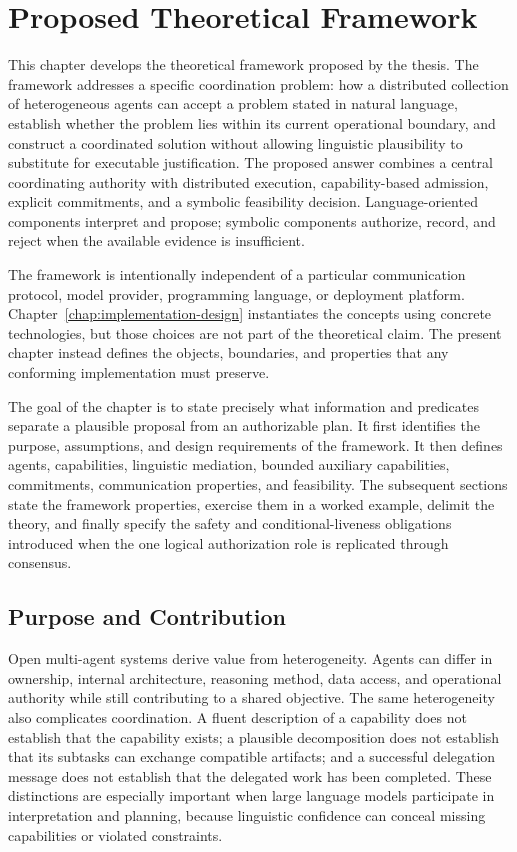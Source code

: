 \chapter{Proposed Theoretical Framework}
\label{chap:theoretical-solution}

This chapter develops the theoretical framework proposed by the thesis. The framework addresses a specific coordination problem: how a distributed collection of heterogeneous agents can accept a problem stated in natural language, establish whether the problem lies within its current operational boundary, and construct a coordinated solution without allowing linguistic plausibility to substitute for executable justification. The proposed answer combines a central coordinating authority with distributed execution, capability-based admission, explicit commitments, and a symbolic feasibility decision. Language-oriented components interpret and propose; symbolic components authorize, record, and reject when the available evidence is insufficient.

The framework is intentionally independent of a particular communication protocol, model provider, programming language, or deployment platform. Chapter~\ref{chap:implementation-design} instantiates the concepts using concrete technologies, but those choices are not part of the theoretical claim. The present chapter instead defines the objects, boundaries, and properties that any conforming implementation must preserve.

The goal of the chapter is to state precisely what information and predicates separate a plausible proposal from an authorizable plan. It first identifies the purpose, assumptions, and design requirements of the framework. It then defines agents, capabilities, linguistic mediation, bounded auxiliary capabilities, commitments, communication properties, and feasibility. The subsequent sections state the framework properties, exercise them in a worked example, delimit the theory, and finally specify the safety and conditional-liveness obligations introduced when the one logical authorization role is replicated through consensus.

\section{Purpose and Contribution}

Open multi-agent systems derive value from heterogeneity. Agents can differ in ownership, internal architecture, reasoning method, data access, and operational authority while still contributing to a shared objective. The same heterogeneity also complicates coordination. A fluent description of a capability does not establish that the capability exists; a plausible decomposition does not establish that its subtasks can exchange compatible artifacts; and a successful delegation message does not establish that the delegated work has been completed. These distinctions are especially important when large language models participate in interpretation and planning, because linguistic confidence can conceal missing capabilities or violated constraints.

